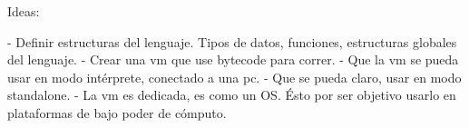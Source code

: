 
Ideas:

 - Definir estructuras del lenguaje. Tipos de datos, funciones, estructuras globales del lenguaje.
 - Crear una vm que use bytecode para correr.
 - Que la vm se pueda usar en modo intérprete, conectado a una pc.
 - Que se pueda claro, usar en modo standalone.
 - La vm es dedicada, es como un OS. Ésto por ser objetivo usarlo en plataformas de bajo poder de cómputo.

